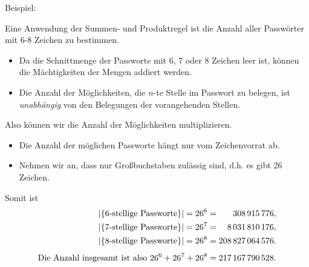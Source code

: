 \documentclass[12pt,ngerman,a4paper,ignorenonframetext,]{beamer}
\providecommand{\tightlist}{%
  \setlength{\itemsep}{0pt}\setlength{\parskip}{0pt}}
\begin{document}
\begin{frame}{Beispiel:}
\protect\hypertarget{beispiel}{}

{\small{}


\begin{Beispiel}

Eine Anwendung der Summen- und Produktregel ist die Anzahl aller
Passwörter mit 6-8 Zeichen zu bestimmen.

\begin{itemize}
\tightlist
\item
  Da die Schnittmenge der Passworte mit 6, 7 oder 8 Zeichen leer ist,
  können die Mächtigkeiten der Mengen addiert werden.
\item
  Die Anzahl der Möglichkeiten, die \(n\)-te Stelle im Passwort zu
  belegen, ist \emph{unabhängig} von den Belegungen der vorangehenden
  Stellen.
\end{itemize}

Also können wir die Anzahl der Möglichkeiten multiplizieren.

\begin{itemize}
\item
  Die Anzahl der möglichen Passworte hängt nur vom Zeichenvorrat ab.
\item
  Nehmen wir an, dass nur Großbuchstaben zulässig sind,
  \mbox{d.\thinspace{}h.}\xspace{} es gibt 26 Zeichen.
\end{itemize}

Somit ist\vspace*{-1.8em} \begin{align*}
    |\{\text{6-stellige Passworte}\}| = 26^6 &= \phantom{208}\,308\,915\,776, \\
    |\{\text{7-stellige Passworte}\}| = 26^7 &= \phantom{20}8\,031\,810\,176, \\
    |\{\text{8-stellige Passworte}\}| = 26^8 &= 208\,827\,064\,576.\\[.4em]
\text{Die Anzahl insgesamt ist also \hfil} 26^6+ 26^7+ 26^8  &=217\,167\,790\,528.
\end{align*}

\end{Beispiel}

}

\end{frame}
\end{document}
